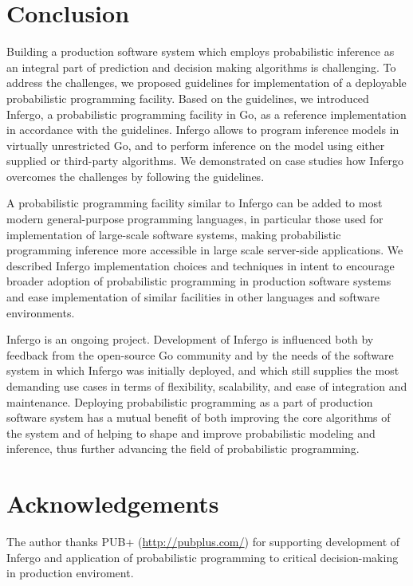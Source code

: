 \documentclass[sigplan,screen]{acmart}
\begin{document}
\begin{sloppypar}
\section{Conclusion}

Building a production software system which employs
probabilistic inference as an integral part of prediction and
decision making algorithms is challenging. To address the
challenges, we proposed guidelines for implementation of a
deployable probabilistic programming facility. Based on the
guidelines, we introduced Infergo, a probabilistic programming
facility in Go, as a reference implementation in accordance with
the guidelines.  Infergo allows to program inference models in
virtually unrestricted Go, and to perform inference on the model
using either supplied or third-party algorithms. We demonstrated
on case studies how Infergo overcomes the challenges by
following the guidelines.

A probabilistic programming facility similar to Infergo can be
added to most modern general-purpose programming languages, in
particular those used for implementation of large-scale software
systems, making probabilistic programming inference more
accessible in large scale server-side applications. We described
Infergo implementation choices and techniques in intent
to encourage broader adoption of probabilistic programming in
production software systems and ease implementation of similar
facilities in other languages and software environments.

Infergo is an ongoing project. Development of Infergo is
influenced both by feedback from the open-source Go community
and by the needs of the software system in which Infergo was
initially deployed, and which still supplies the most demanding
use cases in terms of flexibility, scalability, and ease of
integration and maintenance. Deploying probabilistic programming
as a part of production software system has a mutual benefit of
both improving the core algorithms of the system and of helping
to shape and improve probabilistic modeling and inference, thus
further advancing the field of probabilistic programming.

\end{sloppypar}

\section*{Acknowledgements}

The author thanks PUB+ (\url{http://pubplus.com/}) for
supporting development of Infergo and application of
probabilistic programming to critical decision-making in
production enviroment.


\end{document}
